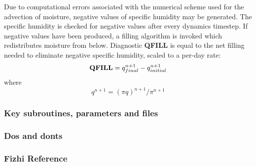 \noindent
Due to computational errors associated with the numerical scheme used for
the advection of moisture, negative values of specific humidity may be generated.  The
specific humidity is checked for negative values after every dynamics timestep.  If negative
values have been produced, a filling algorithm is invoked which redistributes moisture from
below.  Diagnostic {\bf QFILL} is equal to the net filling needed
to eliminate negative specific humidity, scaled to a per-day rate:
\[
{\bf QFILL} = q^{n+1}_{final} - q^{n+1}_{initial}
\]
where
\[
q^{n+1} = (\pi q)^{n+1} / \pi^{n+1}
\]


\subsubsection{Key subroutines, parameters and files}

\subsubsection{Dos and donts}

\subsubsection{Fizhi Reference}

